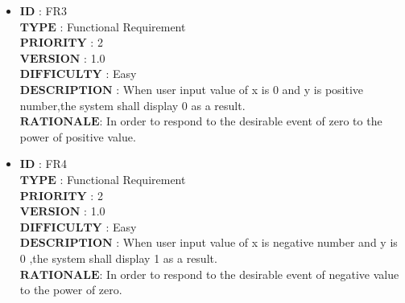 \documentclass[a4paper, 11pt]{article}
\begin{document}
\begin{itemize}
   
  \item $\boldsymbol{ID}$\hspace{2.95cm}   : FR3\\
   $\boldsymbol{TYPE}$\hspace{2.2cm}   : Functional Requirement\\
   $\boldsymbol{PRIORITY}$\hspace{1.05cm} : 2\\
   $\boldsymbol{VERSION}$\hspace{1.25cm} : 1.0\\
   $\boldsymbol{DIFFICULTY}$\hspace{0.4cm} : Easy \\
   $\boldsymbol{DESCRIPTION}$  : When user input value of x is 0 and y is positive number,the system shall display 0 as a result.\\
   $\boldsymbol{RATIONALE}$\hspace{0.8cm}: In order to respond to the desirable event of zero to the power of positive value.\\
   
   \item $\boldsymbol{ID}$\hspace{2.95cm}   : FR4\\
   $\boldsymbol{TYPE}$\hspace{2.2cm}   : Functional Requirement\\
   $\boldsymbol{PRIORITY}$\hspace{1.05cm} : 2\\
   $\boldsymbol{VERSION}$\hspace{1.25cm} : 1.0\\
   $\boldsymbol{DIFFICULTY}$\hspace{0.4cm} : Easy \\
   $\boldsymbol{DESCRIPTION}$   : When user input value of x is negative number and y is 0 ,the system shall display 1 as a result.\\
   $\boldsymbol{RATIONALE}$\hspace{0.8cm}: In order to respond to the desirable event of negative value to the power of zero.\\
   

\end{itemize}
\end{document}
